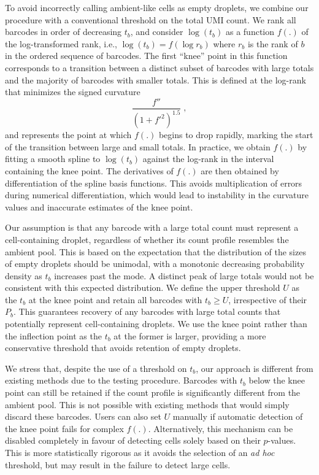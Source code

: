 \documentclass[10pt,letterpaper]{article}
\begin{document}
To avoid incorrectly calling ambient-like cells as empty droplets, we combine our procedure with a conventional threshold on the total UMI count.
We rank all barcodes in order of decreasing $t_b$, and consider $\log(t_b)$ as a function $f(.)$ of the log-transformed rank,
i.e., $\log(t_b) = f(\log r_b)$ where $r_b$ is the rank of $b$ in the ordered sequence of barcodes.
The first ``knee'' point in this function corresponds to a transition between a distinct subset of barcodes with large totals and the majority of barcodes with smaller totals.
This is defined at the log-rank that minimizes the signed curvature
\[
    \frac{f''}{(1 + f'^2)^{1.5}} \;,
\]
and represents the point at which $f(.)$ begins to drop rapidly, marking the start of the transition between large and small totals.
In practice, we obtain $f(.)$ by fitting a smooth spline to $\log(t_b)$ against the log-rank in the interval containing the knee point.
The derivatives of $f(.)$ are then obtained by differentiation of the spline basis functions.
This avoids multiplication of errors during numerical differentiation, which would lead to instability in the curvature values and inaccurate estimates of the knee point.

Our assumption is that any barcode with a large total count must represent a cell-containing droplet, regardless of whether its count profile resembles the ambient pool.
This is based on the expectation that the distribution of the sizes of empty droplets should be unimodal, with a monotonic decreasing probability density as $t_b$ increases past the mode.
A distinct peak of large totals would not be consistent with this expected distribution.
We define the upper threshold $U$ as the $t_b$ at the knee point and retain all barcodes with $t_b \ge U$, irrespective of their $P_b$.
This guarantees recovery of any barcodes with large total counts that potentially represent cell-containing droplets. 
We use the knee point rather than the inflection point as the $t_b$ at the former is larger, providing a more conservative threshold that avoids retention of empty droplets.

We stress that, despite the use of a threshold on $t_b$, our approach is different from existing methods due to the testing procedure.
Barcodes with $t_b$ below the knee point can still be retained if the count profile is significantly different from the ambient pool.
This is not possible with existing methods that would simply discard these barcodes.
Users can also set $U$ manually if automatic detection of the knee point fails for complex $f(.)$.
Alternatively, this mechanism can be disabled completely in favour of detecting cells solely based on their $p$-values.
This is more statistically rigorous as it avoids the selection of an \textit{ad hoc} threshold, but may result in the failure to detect large cells.
\end{document}
